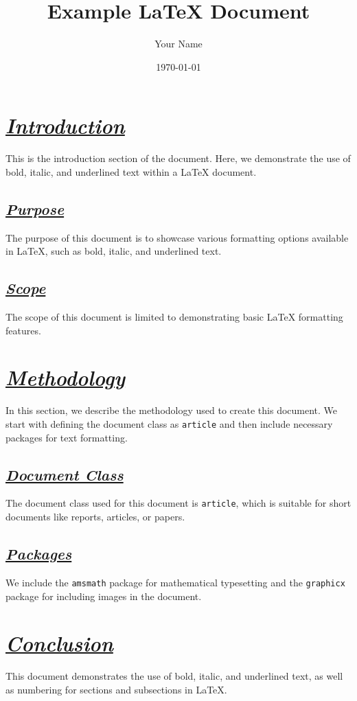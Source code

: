 \documentclass{article}
\begin{document}
\title{Example LaTeX Document}
\author{Your Name}
\date{\today}
\maketitle

\section{\textbf{\textit{\underline{Introduction}}}}

This is the introduction section of the document. Here, we demonstrate the use of bold, italic, and underlined text within a LaTeX document.

\subsection{\textbf{\textit{\underline{Purpose}}}}

The purpose of this document is to showcase various formatting options available in LaTeX, such as bold, italic, and underlined text.

\subsection{\textbf{\textit{\underline{Scope}}}}

The scope of this document is limited to demonstrating basic LaTeX formatting features.

\section{\textbf{\textit{\underline{Methodology}}}}

In this section, we describe the methodology used to create this document. We start with defining the document class as \texttt{article} and then include necessary packages for text formatting.

\subsection{\textbf{\textit{\underline{Document Class}}}}

The document class used for this document is \texttt{article}, which is suitable for short documents like reports, articles, or papers.

\subsection{\textbf{\textit{\underline{Packages}}}}

We include the \texttt{amsmath} package for mathematical typesetting and the \texttt{graphicx} package for including images in the document.

\section{\textbf{\textit{\underline{Conclusion}}}}

This document demonstrates the use of bold, italic, and underlined text, as well as numbering for sections and subsections in LaTeX.
\end{document}

